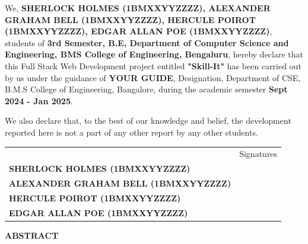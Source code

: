     \begin{spacing}{1.25}
        
        \noindent
        \large We, \textbf{SHERLOCK HOLMES (1BMXXYYZZZZ), ALEXANDER GRAHAM BELL (1BMXXYYZZZZ), HERCULE POIROT (1BMXXYYZZZZ), EDGAR ALLAN POE (1BMXXYYZZZZ)}, students of \textbf{3rd Semester, B.E, Department of Computer Science and Engineering, BMS College of Engineering, Bengaluru}, hereby declare that this Full Stack Web Development project entitled \textbf{"Skill-It"} has been carried out by us under the guidance of \textbf{YOUR GUIDE}, Designation, Department of CSE, B.M.S College of Engineering, Bangalore, during the academic semester \textbf{Sept 2024 - Jan 2025}.

        \noindent
        \Large We also declare that, to the best of our knowledge and belief, the development reported here is not a part of any other report by any other students.
        
        \vspace{1cm}
        \setlength\tabcolsep{0pt}
        \noindent
        \begingroup
        \fontsize{14pt}{12pt}
        \begin{tabulary}{0.95\linewidth}{LR}
            & Signatures \\
            \textbf{SHERLOCK HOLMES (1BMXXYYZZZZ)} & \\
            \textbf{ALEXANDER GRAHAM BELL (1BMXXYYZZZZ)} & \\
            \textbf{HERCULE POIROT (1BMXXYYZZZZ)} & \\
            \textbf{EDGAR ALLAN POE (1BMXXYYZZZZ)} & \\
        \end{tabulary}
        \endgroup
    \end{spacing}
\clearpage
    \begin{center}
    \Large \textbf{ABSTRACT}
    \end{center}
    \begin{spacing}{2.0}
        \lipsum[0-5]
    \end{spacing}

